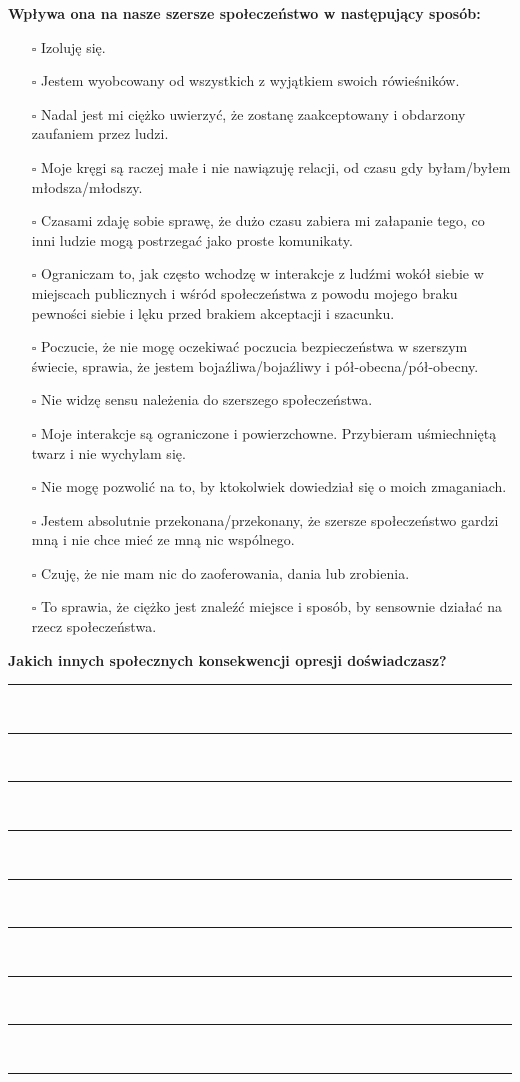 \newpage
\noindent
\textbf{\large{Wpływa ona na nasze szersze społeczeństwo w następujący sposób:}}
\begin{multicols}{2}
\begin{itemize}
\item[$\square$]{Izoluję się.}
\item[$\square$]{Jestem wyobcowany od wszystkich z wyjątkiem swoich rówieśników.}
\item[$\square$]{Nadal jest mi ciężko uwierzyć, że zostanę zaakceptowany i obdarzony zaufaniem przez ludzi.}
\item[$\square$]{Moje kręgi są raczej małe i nie nawiązuję relacji, od czasu gdy byłam/byłem młodsza/młodszy.}
\item[$\square$]{Czasami zdaję sobie sprawę, że dużo czasu zabiera mi załapanie tego, co inni ludzie mogą postrzegać jako proste komunikaty.}
\item[$\square$]{Ograniczam to, jak często wchodzę w interakcje z ludźmi wokół siebie w miejscach publicznych i wśród społeczeństwa z powodu mojego braku pewności siebie i lęku przed brakiem akceptacji i szacunku.}
\item[$\square$]{Poczucie, że nie mogę oczekiwać poczucia bezpieczeństwa w szerszym świecie, sprawia, że jestem bojaźliwa/bojaźliwy i pół-obecna/pół-obecny.}
\item[$\square$]{Nie widzę sensu należenia do szerszego społeczeństwa.}
\item[$\square$]{Moje interakcje są ograniczone i powierzchowne. Przybieram uśmiechniętą twarz i nie wychylam się.}
\item[$\square$]{Nie mogę pozwolić na to, by ktokolwiek dowiedział się o moich zmaganiach.}
\item[$\square$]{Jestem absolutnie przekonana/przekonany, że szersze społeczeństwo gardzi mną i nie chce mieć ze mną nic wspólnego.}
\item[$\square$]{Czuję, że nie mam nic do zaoferowania, dania lub zrobienia.}
\item[$\square$]{To sprawia, że ciężko jest znaleźć miejsce i sposób, by sensownie działać na rzecz społeczeństwa.}
\end{itemize}
\end{multicols}

\noindent
\textcolor{ProcessBlue}{\textbf{\Large{Jakich innych społecznych konsekwencji opresji doświadczasz?}}}\\
\noindent\rule{\textwidth}{1pt}\\
\noindent\rule{\textwidth}{1pt}\\
\noindent\rule{\textwidth}{1pt}\\
\noindent\rule{\textwidth}{1pt}\\
\noindent\rule{\textwidth}{1pt}\\
\noindent\rule{\textwidth}{1pt}\\
\noindent\rule{\textwidth}{1pt}\\
\noindent\rule{\textwidth}{1pt}\\
\noindent\rule{\textwidth}{1pt}\\\\


